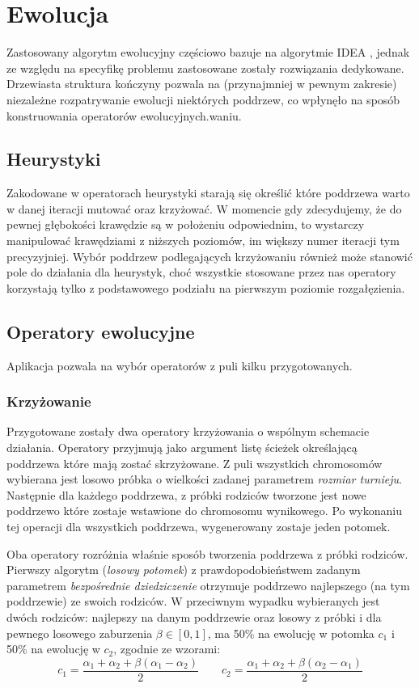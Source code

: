 \documentclass[11pt, leqno]{article}
\renewcommand{\i}[1]{\textit{#1}}
\begin{document}
\section{Ewolucja}
Zastosowany algorytm ewolucyjny częściowo bazuje na algorytmie IDEA \cite{PFI}, jednak ze względu na specyfikę problemu zastosowane zostały rozwiązania dedykowane. Drzewiasta struktura kończyny pozwala na (przynajmniej w pewnym zakresie) niezależne rozpatrywanie ewolucji niektórych poddrzew, co wpłynęło na sposób konstruowania operatorów ewolucyjnych.waniu.

\subsection{Heurystyki}
Zakodowane w operatorach heurystyki starają się określić które poddrzewa warto w danej iteracji mutować oraz krzyżować. W momencie gdy zdecydujemy, że do pewnej głębokości krawędzie są w położeniu odpowiednim, to wystarczy manipulować krawędziami z niższych poziomów, im większy numer iteracji tym precyzyjniej. Wybór poddrzew podlegających krzyżowaniu również może stanowić pole do działania dla heurystyk, choć wszystkie stosowane przez nas operatory korzystają tylko z podstawowego podziału na pierwszym poziomie rozgałęzienia.

\subsection{Operatory ewolucyjne}
Aplikacja pozwala na wybór operatorów z puli kilku przygotowanych.

\subsubsection{Krzyżowanie}
Przygotowane zostały dwa operatory krzyżowania o wspólnym schemacie działania. Operatory przyjmują jako argument listę ścieżek określającą poddrzewa które mają zostać skrzyżowane. Z puli wszystkich chromosomów wybierana jest losowo próbka o wielkości zadanej parametrem \i{rozmiar turnieju}. Następnie dla każdego poddrzewa, z próbki rodziców tworzone jest nowe poddrzewo które zostaje wstawione do chromosomu wynikowego. Po wykonaniu tej operacji dla wszystkich poddrzewa, wygenerowany zostaje jeden potomek.

Oba operatory rozróżnia właśnie sposób tworzenia poddrzewa z próbki rodziców. Pierwszy algorytm (\i{losowy potomek}) z prawdopodobieństwem zadanym parametrem \i{bezpośrednie dziedziczenie} otrzymuje poddrzewo najlepszego (na tym poddrzewie) ze swoich rodziców. W przeciwnym wypadku wybieranych jest dwóch rodziców: najlepszy na danym poddrzewie oraz losowy z próbki i dla pewnego losowego zaburzenia $\beta\in[0, 1]$, ma 50\% na ewolucję w potomka $c_1$ i 50\% na ewolucję w $c_2$, zgodnie ze wzorami:
	\[
		c_1 = \frac{\alpha_1 + \alpha_2 + \beta(\alpha_1 - \alpha_2)}{2} \quad\quad c_2 = \frac{\alpha_1 + \alpha_2 + \beta(\alpha_2 - \alpha_1)}{2}
	\]
\end{document}
